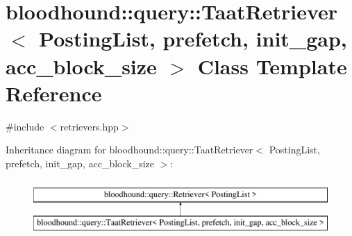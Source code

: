 \hypertarget{classbloodhound_1_1query_1_1TaatRetriever}{}\section{bloodhound\+:\+:query\+:\+:Taat\+Retriever$<$ Posting\+List, prefetch, init\+\_\+gap, acc\+\_\+block\+\_\+size $>$ Class Template Reference}
\label{classbloodhound_1_1query_1_1TaatRetriever}


{\ttfamily \#include $<$retrievers.\+hpp$>$}

Inheritance diagram for bloodhound\+:\+:query\+:\+:Taat\+Retriever$<$ Posting\+List, prefetch, init\+\_\+gap, acc\+\_\+block\+\_\+size $>$\+:\begin{figure}[H]
\begin{center}
\leavevmode
\includegraphics[height=2.000000cm]{classbloodhound_1_1query_1_1TaatRetriever}
\end{center}
\end{figure}
